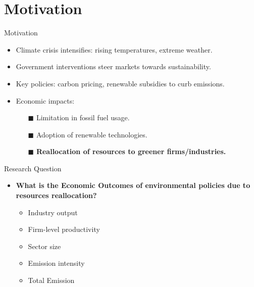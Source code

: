 \documentclass[aspectratio=169]{beamer}
\subtitle{}
\institute[SSE]{Stockholm School of Economics}
\begin{document}
\maketitle
\section{Motivation}
\begin{frame}{Motivation}\large 
	\begin{itemize}
        \item Climate crisis intensifies: rising temperatures, extreme weather.
        \pause
        \item Government interventions steer markets towards sustainability.
        \item Key policies: carbon pricing, renewable subsidies to curb emissions.
        \item Economic impacts:
            \begin{itemize}
                \item[$\blacksquare$] Limitation in fossil fuel usage.
                \item[$\blacksquare$] Adoption of renewable technologies.\pause
                \item[$\blacksquare$] {\bf Reallocation of resources to greener firms/industries.}
            \end{itemize}
	\end{itemize}
\end{frame}
\begin{frame}{Research Question}
	\begin{itemize}
		\item \textbf{What is the Economic Outcomes of environmental policies due to resources reallocation?}
		\begin{itemize}
			\item Industry output
			\item Firm-level productivity
			\item Sector size
			\item Emission intensity
			\item Total Emission
		\end{itemize}
	\end{itemize}
\end{frame}
\end{document}
